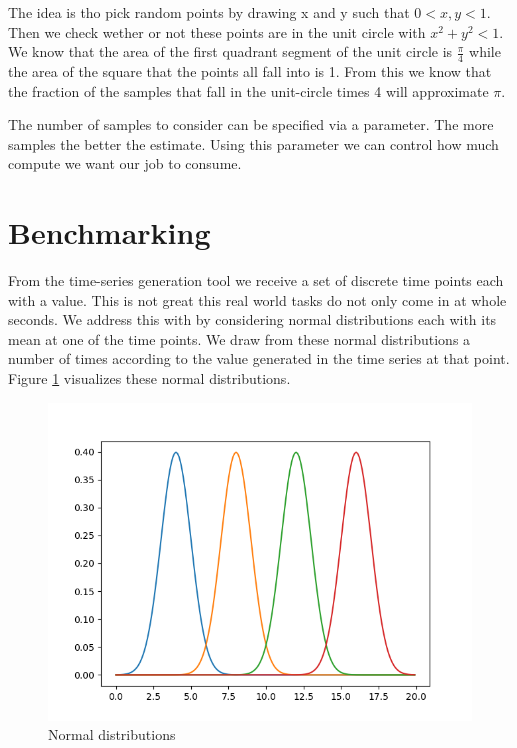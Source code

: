 The idea is tho pick random points by drawing x and y such that $0 < x, y < 1$. Then we check wether or not these points are in the unit circle with $x^2 + y^2 < 1$. We know that the area of the first quadrant segment of the unit circle is $\frac{\pi}{4}$ while the area of the square that the points all fall into is 1. From this we know that the fraction of the samples that fall in the unit-circle times 4 will approximate $\pi$.

The number of samples to consider can be specified via a parameter. The more samples the better the estimate. Using this parameter we can control how much compute we want our job to consume. 

\section{Benchmarking}

From the time-series generation tool we receive a set of discrete time points each with a value. This is not great this real world tasks do not only come in at whole seconds. We address this with by considering normal distributions each with its mean at one of the time points. We draw from these normal distributions a number of times according to the value generated in the time series at that point. Figure \ref{fig:normal-dists} visualizes these normal distributions.

\begin{figure}
   \centering
   \includegraphics[scale=0.70]{figures/normal-dists.png}
\caption{Normal distributions}    
\label{fig:normal-dists}
\end{figure}

